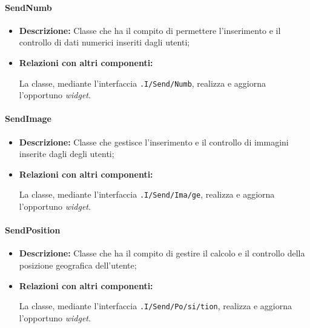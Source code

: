\paragraph{SendNumb}
\label{sendNumb}
\begin{flushleft}
\begin{itemize}
\item \textbf{Descrizione:} Classe che ha il compito di permettere l'inserimento e il controllo di dati numerici inseriti dagli utenti;
\item \textbf{Relazioni con altri componenti:}
\begin{sloppypar}
La classe, mediante l'interfaccia \texttt{\viewUser{}.I\fshyp{}Send\fshyp{}Numb}, realizza e aggiorna l'opportuno \textit{widget}.
\end{sloppypar}
\end{itemize}
\end{flushleft}

\paragraph{SendImage}
\label{sendImage}
\begin{flushleft}
\begin{itemize}
\item \textbf{Descrizione:} Classe che gestisce l'inserimento e il controllo di immagini inserite dagli degli utenti;
\item \textbf{Relazioni con altri componenti:}
\begin{sloppypar}
La classe, mediante l'interfaccia \texttt{\viewUser{}.I\fshyp{}Send\fshyp{}Ima\fshyp{}ge}, realizza e aggiorna l'opportuno \textit{widget}.
\end{sloppypar}
\end{itemize}
\end{flushleft}

\paragraph{SendPosition}
\label{sendPosition}
\begin{flushleft}
\begin{itemize}
\item \textbf{Descrizione:} Classe che ha il compito di gestire il calcolo e il controllo della posizione geografica dell'utente;
\item \textbf{Relazioni con altri componenti:}
\begin{sloppypar}
La classe, mediante l'interfaccia \texttt{\viewUser{}.I\fshyp{}Send\fshyp{}Po\fshyp{}si\fshyp{}tion}, realizza e aggiorna l'opportuno \textit{widget}.
\end{sloppypar}
\end{itemize}
\end{flushleft}